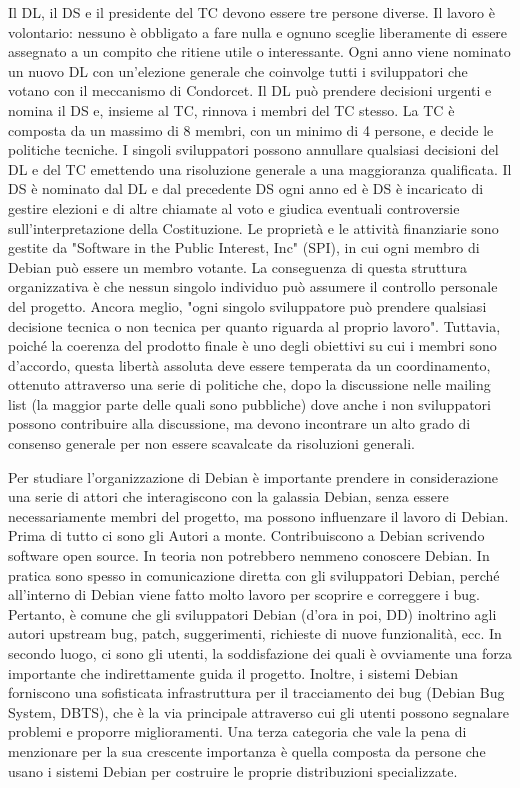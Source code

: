 \documentclass[a4paper,12pt,titlepage,oneside]{book}
\begin{document}
    Il DL, il DS e il presidente del TC devono essere tre persone diverse. Il lavoro è volontario: nessuno è obbligato a fare nulla e ognuno sceglie liberamente di essere assegnato a un 
    compito che ritiene utile o interessante. Ogni anno viene nominato un nuovo DL con un'elezione generale che coinvolge tutti i sviluppatori che votano con il meccanismo di Condorcet.
    Il DL può prendere decisioni urgenti e nomina il DS e, insieme al TC, rinnova i membri del TC stesso. La TC è composta da un massimo di 8 membri, con un minimo di 4 persone, e decide le
    politiche tecniche. I singoli sviluppatori possono annullare qualsiasi decisioni del DL e del TC emettendo una risoluzione generale a una maggioranza qualificata. 
    Il DS è nominato dal DL e dal precedente DS ogni anno ed è DS è incaricato di gestire elezioni e di altre chiamate al voto e giudica eventuali controversie sull'interpretazione della Costituzione. 
    Le proprietà e le attività finanziarie sono gestite da "Software in the Public Interest, Inc" (SPI), in cui ogni membro di Debian può essere un membro votante.
    La conseguenza di questa struttura organizzativa è che nessun singolo individuo può assumere il controllo personale del progetto. Ancora meglio, "ogni singolo sviluppatore può
    prendere qualsiasi decisione tecnica o non tecnica per quanto riguarda al proprio lavoro". Tuttavia, poiché la coerenza del prodotto finale è uno degli obiettivi
    su cui i membri sono d'accordo, questa libertà assoluta deve essere temperata da un coordinamento, ottenuto attraverso una serie di politiche che, dopo la
    discussione nelle mailing list (la maggior parte delle quali sono pubbliche) dove anche i non sviluppatori possono contribuire alla discussione, ma devono
    incontrare un alto grado di consenso generale per non essere scavalcate da risoluzioni generali. 
    
    Per studiare l'organizzazione di Debian è importante prendere in considerazione una serie di attori che interagiscono con la galassia Debian, senza essere necessariamente membri del progetto, ma possono 
    influenzare il lavoro di Debian. Prima di tutto ci sono gli Autori a monte. Contribuiscono a Debian scrivendo software open source. In teoria non potrebbero nemmeno conoscere Debian. In pratica sono
    spesso in comunicazione diretta con gli sviluppatori Debian, perché all'interno di Debian viene fatto molto lavoro per scoprire e correggere i bug. Pertanto, è comune che gli sviluppatori Debian (d'ora in poi, DD)
    inoltrino agli autori upstream bug, patch, suggerimenti, richieste di nuove funzionalità, ecc.
    In secondo luogo, ci sono gli utenti, la soddisfazione dei quali è ovviamente una forza importante che indirettamente guida il progetto. Inoltre, i sistemi Debian forniscono una
    sofisticata infrastruttura per il tracciamento dei bug (Debian Bug System, DBTS), che è la via principale attraverso cui gli utenti possono segnalare problemi e proporre
    miglioramenti. Una terza categoria che vale la pena di menzionare per la sua
    crescente importanza è quella composta da persone che usano i sistemi Debian per costruire le proprie distribuzioni specializzate.
   
\end{document}
